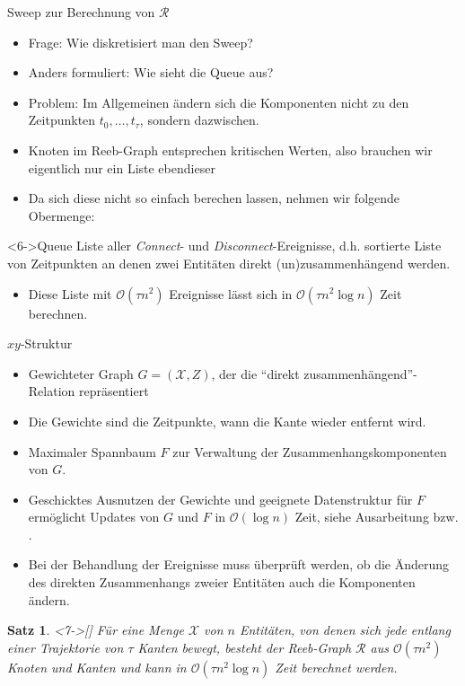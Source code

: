 \documentclass[
wide,
10pt,
xcolor={x11names,svgnames},
hyperref={pdfauthor={Jannes Bantje},colorlinks,urlcolor=maincolor,hidelinks=false,linkcolor=maincolor},
pantone312, 	%
euler-digits,
]{beamer}
\newtheorem{satz}{Satz}
\theoremstyle{definition}
\begin{document}
\begin{frame}{Sweep zur Berechnung von $\mathcal{R}$}
    \begin{itemize}[<+->]
        \item Frage: Wie diskretisiert man den Sweep?
        \item Anders formuliert: Wie sieht die Queue aus?
        \item Problem: Im Allgemeinen ändern sich die Komponenten nicht zu den Zeitpunkten $t_0, \ldots, t_\tau$, sondern dazwischen.
        \item Knoten im Reeb-Graph entsprechen kritischen Werten, also brauchen wir eigentlich nur ein Liste ebendieser
        \item Da sich diese nicht so einfach berechen lassen, nehmen wir folgende Obermenge:
    \end{itemize}
    \begin{block}<6->{Queue}
        Liste aller \emph{Connect}- und \emph{Disconnect}-Ereignisse, d.h. sortierte Liste von Zeitpunkten an denen zwei Entitäten direkt (un)zusammenhängend werden.
    \end{block}
    \begin{itemize}
        \item<7-> Diese Liste mit $\mathcal{O}(\tau n^2)$ Ereignisse lässt sich in $\mathcal{O}(\tau n^2 \log n)$ Zeit berechnen.
    \end{itemize}
\end{frame}

\begin{frame}%
    \begin{block}{$xy$-Struktur}\pause
        \begin{itemize}[<+->]
            \item Gewichteter Graph $G=(\mathcal{X},Z)$, der die \enquote{direkt zusammenhängend}-Relation repräsentiert
            \item Die Gewichte sind die Zeitpunkte, wann die Kante wieder entfernt wird.
            \item Maximaler Spannbaum $F$ zur Verwaltung der Zusammenhangskomponenten von $G$.
        \end{itemize}
    \end{block}
    \begin{itemize}
        \item<5-> Geschicktes Ausnutzen der Gewichte und geeignete Datenstruktur für $F$ ermöglicht Updates von $G$ und $F$ in $\mathcal{O}(\log n)$ Zeit, siehe Ausarbeitung bzw. \cites{buchin2015}{parsaReeb}.
        \item<6-> Bei der Behandlung der Ereignisse muss überprüft werden, ob die Änderung des direkten Zusammenhangs zweier Entitäten auch die Komponenten ändern.
    \end{itemize}
    \begin{satz}<7->[{\cite[Thm.~7]{buchin2015}}]
    	Für eine Menge $\mathcal{X}$ von $n$ Entitäten, von denen sich jede entlang einer Trajektorie von $\tau$ Kanten bewegt, besteht der Reeb-Graph $\mathcal{R}$ aus $\mathcal{O}(\tau n^2)$ Knoten und Kanten und kann in $\mathcal{O}(\tau n^2 \log n)$ Zeit berechnet werden.
    \end{satz}
\end{frame}
\end{document}
